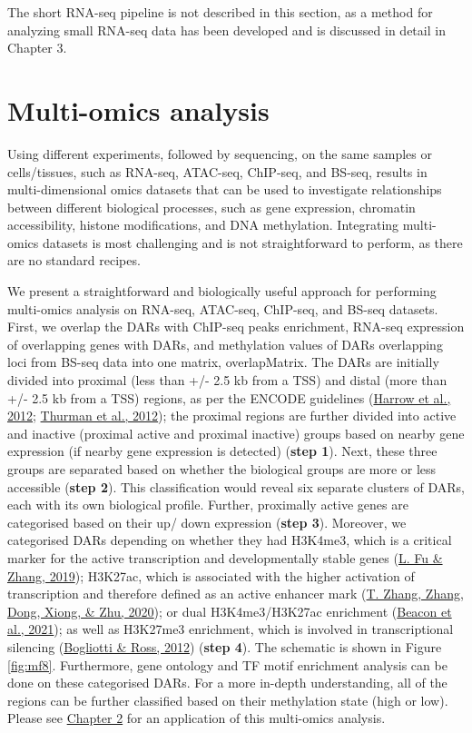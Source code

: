 \documentclass[12pt,twoside]{reedthesis}
\begin{document}
The short RNA-seq pipeline is not described in this section, as a method
for analyzing small RNA-seq data has been developed and is discussed in
detail in Chapter 3.

\hypertarget{m3.7}{%
\section*{Multi-omics analysis}\label{m3.7}}

Using different experiments, followed by sequencing, on the same samples
or cells/tissues, such as RNA-seq, ATAC-seq, ChIP-seq, and BS-seq,
results in multi-dimensional omics datasets that can be used to
investigate relationships between different biological processes, such
as gene expression, chromatin accessibility, histone modifications, and
DNA methylation. Integrating multi-omics datasets is most challenging
and is not straightforward to perform, as there are no standard recipes.

We present a straightforward and biologically useful approach for
performing multi-omics analysis on RNA-seq, ATAC-seq, ChIP-seq, and
BS-seq datasets. First, we overlap the DARs with ChIP-seq peaks
enrichment, RNA-seq expression of overlapping genes with DARs, and
methylation values of DARs overlapping loci from BS-seq data into one
matrix, overlapMatrix. The DARs are initially divided into proximal
(less than +/- 2.5 kb from a TSS) and distal (more than +/- 2.5 kb from
a TSS) regions, as per the ENCODE guidelines (\protect\hyperlink{ref-harrow2012}{Harrow et al., 2012}; \protect\hyperlink{ref-thurman2012}{Thurman et al., 2012}); the proximal regions are further divided into active and
inactive (proximal active and proximal inactive) groups based on nearby
gene expression (if nearby gene expression is detected) (\textbf{step 1}).
Next, these three groups are separated based on whether the biological
groups are more or less accessible (\textbf{step 2}). This classification
would reveal six separate clusters of DARs, each with its own biological
profile. Further, proximally active genes are categorised based on their
up/ down expression (\textbf{step 3}). Moreover, we categorised DARs
depending on whether they had H3K4me3, which is a critical marker for
the active transcription and developmentally stable genes (\protect\hyperlink{ref-fu2019}{L. Fu \& Zhang, 2019});
H3K27ac, which is associated with the higher activation of transcription
and therefore defined as an active enhancer mark (\protect\hyperlink{ref-zhang2020}{T. Zhang, Zhang, Dong, Xiong, \& Zhu, 2020}); or dual
H3K4me3/H3K27ac enrichment (\protect\hyperlink{ref-beacon2021}{Beacon et al., 2021}); as well as H3K27me3
enrichment, which is involved in transcriptional silencing
(\protect\hyperlink{ref-bogliotti2012}{Bogliotti \& Ross, 2012}) (\textbf{step 4}). The schematic is shown in Figure
\ref{fig:mf8}. Furthermore, gene ontology and TF motif enrichment
analysis can be done on these categorised DARs. For a more in-depth
understanding, all of the regions can be further classified based on
their methylation state (high or low). Please see \protect\hyperlink{chapter2}{Chapter 2}
for an application of this multi-omics analysis.
\end{document}
